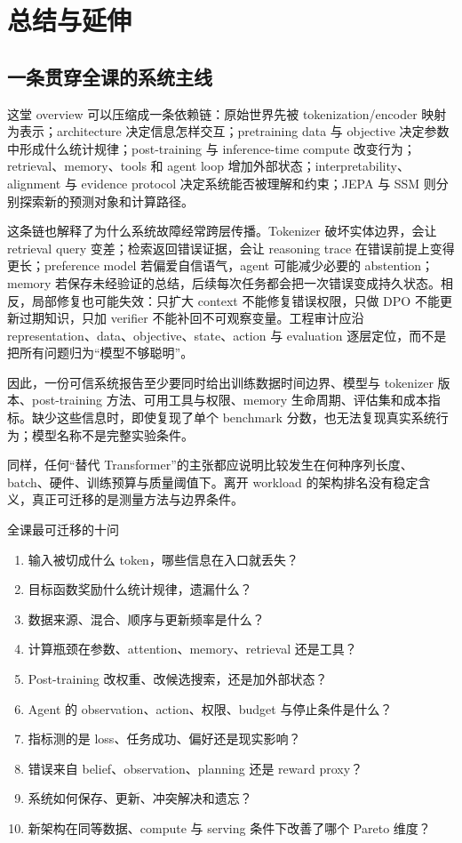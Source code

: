 \section{总结与延伸}

\subsection{一条贯穿全课的系统主线}

这堂 overview 可以压缩成一条依赖链：原始世界先被 tokenization/encoder 映射为表示；architecture 决定信息怎样交互；pretraining data 与 objective 决定参数中形成什么统计规律；post-training 与 inference-time compute 改变行为；retrieval、memory、tools 和 agent loop 增加外部状态；interpretability、alignment 与 evidence protocol 决定系统能否被理解和约束；JEPA 与 SSM 则分别探索新的预测对象和计算路径。

这条链也解释了为什么系统故障经常跨层传播。Tokenizer 破坏实体边界，会让 retrieval query 变差；检索返回错误证据，会让 reasoning trace 在错误前提上变得更长；preference model 若偏爱自信语气，agent 可能减少必要的 abstention；memory 若保存未经验证的总结，后续每次任务都会把一次错误变成持久状态。相反，局部修复也可能失效：只扩大 context 不能修复错误权限，只做 DPO 不能更新过期知识，只加 verifier 不能补回不可观察变量。工程审计应沿 representation、data、objective、state、action 与 evaluation 逐层定位，而不是把所有问题归为“模型不够聪明”。

因此，一份可信系统报告至少要同时给出训练数据时间边界、模型与 tokenizer 版本、post-training 方法、可用工具与权限、memory 生命周期、评估集和成本指标。缺少这些信息时，即使复现了单个 benchmark 分数，也无法复现真实系统行为；模型名称不是完整实验条件。

同样，任何“替代 Transformer”的主张都应说明比较发生在何种序列长度、batch、硬件、训练预算与质量阈值下。离开 workload 的架构排名没有稳定含义，真正可迁移的是测量方法与边界条件。

\begin{importantbox}{全课最可迁移的十问}
\begin{enumerate}
  \item 输入被切成什么 token，哪些信息在入口就丢失？
  \item 目标函数奖励什么统计规律，遗漏什么？
  \item 数据来源、混合、顺序与更新频率是什么？
  \item 计算瓶颈在参数、attention、memory、retrieval 还是工具？
  \item Post-training 改权重、改候选搜索，还是加外部状态？
  \item Agent 的 observation、action、权限、budget 与停止条件是什么？
  \item 指标测的是 loss、任务成功、偏好还是现实影响？
  \item 错误来自 belief、observation、planning 还是 reward proxy？
  \item 系统如何保存、更新、冲突解决和遗忘？
  \item 新架构在同等数据、compute 与 serving 条件下改善了哪个 Pareto 维度？
\end{enumerate}
\end{importantbox}

